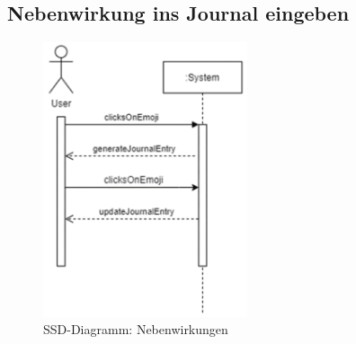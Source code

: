 \subsection{Nebenwirkung ins Journal eingeben }

\begin{figure}
	\includegraphics[width=6cm]{rec/UseCaseNebenwirkungJornal}
	\caption[SSD-Diagramm: Nebenwirkungen]{SSD-Diagramm: Nebenwirkungen}
	\label{fig:usecasenebenwirkungjornal}
\end{figure}


